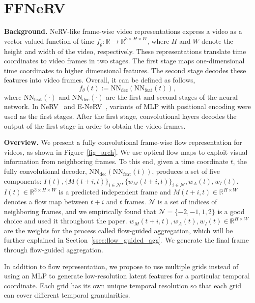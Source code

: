 \documentclass[sigconf]{acmart}
\begin{document}
\section{FFNeRV}

\noindent\textbf{Background.} NeRV-like frame-wise video representations express a video as a vector-valued function of time $\mathit{f_\theta}:\mathbb{R} \rightarrow \mathbb{R}^{3 \times H \times W}$, where $H$ and $W$ denote the height and width of the video, respectively.
These representations translate time coordinates to video frames in two stages.
The first stage maps one-dimensional time coordinates to higher dimensional features.
The second stage decodes these features into video frames.
Overall, it can be defined as follows,
\begin{equation}
\label{eq:nerv_like}
    f_\theta(t) := \textrm{NN}_{\textrm{dec}}(\textrm{NN}_{\textrm{feat}}(t)),
\end{equation}
where $\textrm{NN}_{\textrm{feat}}(\cdot)$ and $\textrm{NN}_{\textrm{dec}}(\cdot)$ are the first and second stages of the neural network.
In NeRV~\cite{nerv} and E-NeRV~\cite{enerv}, variants of MLP with positional encoding were used as the first stages.
After the first stage, convolutional layers decodes the output of the first stage in order to obtain the video frames.


\noindent\textbf{Overview.} We present a fully convolutional frame-wise flow representation for videos, as shown in Figure~\ref{fig_arch}.
We use optical flow maps to exploit visual information from neighboring frames.
To this end, given a time coordinate $t$, the fully convolutional decoder, $\textrm{NN}_{\textrm{dec}}(\textrm{NN}_{\textrm{feat}}(t))$, produces a set of five components: $I(t), \{M(t+i,t)\}_{i \in \mathcal{N}}, \{w_M(t+i,t)\}_{i \in \mathcal{N}}, w_A(t), w_I(t)$.
$I(t)\in \mathbb{R}^{3 \times H \times W}$ is a predicted independent frame and $M(t+i,t)\in \mathbb{R}^{H \times W}$ denotes a flow map between $t+i$ and $t$ frames.
$\mathcal{N}$ is a set of indices of neighboring frames, and we empirically found that $\mathcal{N}=\{-2, -1, 1, 2\}$ is a good choice and used it throughout the paper.
$w_M(t+i,t),w_A(t), w_I(t) \in \mathbb{R}^{H \times W}$ are the weights for the process called flow-guided aggregation, which will be further explained in Section~\ref{ssec:flow_guided_agg}.
We generate the final frame through flow-guided aggregation.

In addition to flow representation, we propose to use multiple grids instead of using an MLP to generate low-resolution latent features for a particular temporal coordinate.
Each grid has its own unique temporal resolution so that each grid can cover different temporal granularities.
\end{document}
